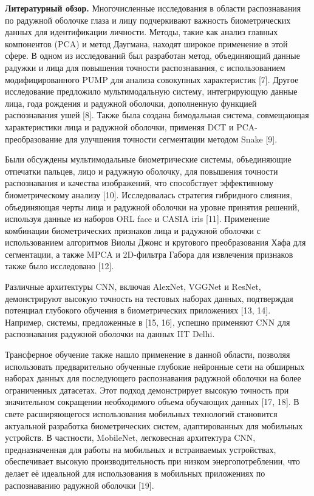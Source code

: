 {\bfseries Литературный обзор.} Многочисленные исследования в области
распознавания по радужной оболочке глаза и лицу подчеркивают важность
биометрических данных для идентификации личности. Методы, такие как
анализ главных компонентов (PCA) и метод Даугмана, находят широкое
применение в этой сфере. В одном из исследований был разработан метод,
объединяющий данные радужки и лица для повышения точности распознавания,
с использованием модифицированного PUMP для анализа совокупных
характеристик {[}7{]}. Другое исследование предложило мультимодальную
систему, интегрирующую данные лица, года рождения и радужной оболочки,
дополненную функцией распознавания ушей {[}8{]}. Также была создана
бимодальная система, совмещающая характеристики лица и радужной
оболочки, применяя DCT и PCA-преобразование для улучшения точности
сегментации методом Snake {[}9{]}.

Были обсуждены мультимодальные биометрические системы, объединяющие
отпечатки пальцев, лицо и радужную оболочку, для повышения точности
распознавания и качества изображений, что способствует эффективному
биометрическому анализу {[}10{]}. Исследовалась стратегия гибридного
слияния, объединяющая черты лица и радужной оболочки на уровне принятия
решений, используя данные из наборов ORL face и CASIA iris {[}11{]}.
Применение комбинации биометрических признаков лица и радужной оболочки
с использованием алгоритмов Виолы Джонс и кругового преобразования Хафа
для сегментации, а также MPCA и 2D-фильтра Габора для извлечения
признаков также было исследовано {[}12{]}.

Различные архитектуры CNN, включая AlexNet, VGGNet и ResNet,
демонстрируют высокую точность на тестовых наборах данных, подтверждая
потенциал глубокого обучения в биометрических приложениях {[}13, 14{]}.
Например, системы, предложенные в {[}15, 16{]}, успешно применяют CNN
для распознавания радужной оболочки на данных IIT Delhi.

Трансферное обучение также нашло применение в данной области, позволяя
использовать предварительно обученные глубокие нейронные сети на
обширных наборах данных для последующего распознавания радужной оболочки
на более ограниченных датасетах. Этот подход демонстрирует высокую
точность при значительном сокращении необходимого объема обучающих
данных {[}17, 18{]}. В свете расширяющегося использования мобильных
технологий становится актуальной разработка биометрических систем,
адаптированных для мобильных устройств. В частности, MobileNet,
легковесная архитектура CNN, предназначенная для работы на мобильных и
встраиваемых устройствах, обеспечивает высокую производительность при
низком энергопотреблении, что делает её идеальной для использования в
мобильных приложениях по распознаванию радужной оболочки {[}19{]}.

